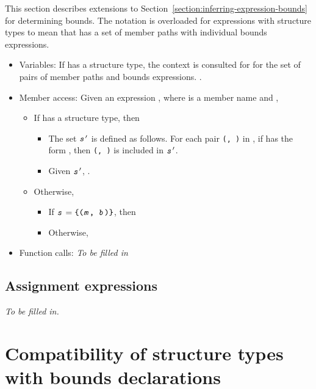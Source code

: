 \begin{enumerate}
This section describes extensions to Section~\ref{section:inferring-expression-bounds} for
determining bounds.   The notation  is overloaded for expressions
with structure types to mean that  has a set of member paths with individual bounds expressions.
\begin{itemize}
\item Variables: If  has a structure type, the context is consulted for  for
the set  of pairs of member paths and bounds expressions.  .
\item Member access: Given an expression , where  is 
a member name and ,
\begin{itemize}
\item If  has a structure type, then
\begin{itemize}
\item The set $\texttt{\textit{s}}^{\prime}$ is defined as follows.  For each pair 
      \texttt{(, )} in , if  has the form 
      , then \texttt{(, )} is
      included in $\texttt{\textit{s}}^\prime$.
\item  Given $\texttt{\textit{s}}^\prime$, .
\end{itemize}
\item Otherwise,
\begin{itemize}
\item If $\texttt{\textit{s}} = \texttt{\{(\texttt{\textit{m}}, \texttt{\textit{b}})\}}$, then 
\item Otherwise, 
\end{itemize}
\end{itemize}
\item Function calls: {\em To be filled in}
\end{itemize}

\subsection{Assignment expressions}

{\em To be filled in.}

\section{Compatibility of structure types with bounds declarations}


\end{enumerate}
